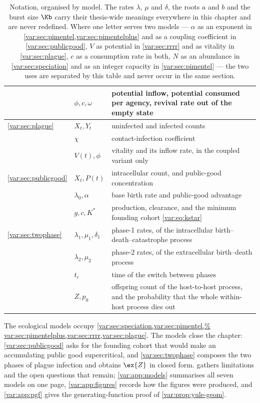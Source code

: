 \begin{table}[H]
\begin{tabular}{@{}ll>{\raggedright\arraybackslash}p{}@{}}
 & $\phi,c,\omega$ & potential inflow, potential consumed per agency, revival rate out of the empty state \\
\midrule
\ref{var:sec:plague}
 & $X_t,Y_t$ & uninfected and infected counts \\
 & $\chi$ & contact-infection coefficient \\
 & $V(t),\phi$ & vitality and its inflow rate, in the coupled variant only \\
\midrule
\ref{var:sec:publicgood}
 & $X_t,P(t)$ & intracellular \yp{} count, and public-good concentration \\
 & $\lambda_0,\alpha$ & base birth rate and public-good advantage \\
 & $g,c,K^\ast$ & production, clearance, and the minimum founding cohort \cref{var:eq:kstar} \\
\midrule
\ref{var:sec:twophase}
 & $\lambda_1,\mu_1,\delta_1$ & phase-1 rates, of the intracellular
   birth--death--catastrophe process \\
 & $\lambda_2,\mu_2$ & phase-2 rates, of the extracellular birth--death
   process \\
 & $t_c$ & time of the switch between phases \\
 & $Z,p_0$ & offspring count of the host-to-host process, and the probability that the whole within-host process dies out \\
\bottomrule
\end{tabular}
\caption{Notation, organised by model. The rates $\lambda$, $\mu$ and
$\delta$, the roots $a$ and $b$ and the burst size $\Kb$ carry their
thesis-wide meanings everywhere in this chapter and are never redefined. Where
one letter serves two models --- $\alpha$ as an exponent in
\cref{var:sec:pimentel,var:sec:pimentelplus} and as a coupling coefficient in
\cref{var:sec:publicgood}, $V$ as potential in \cref{var:sec:rrrr} and as
vitality in \cref{var:sec:plague}, $c$ as a consumption rate in both, $N$ as
an abundance in \cref{var:sec:speciation} and as an integer capacity in
\cref{var:sec:pimentel} --- the two uses are separated by this table and never
occur in the same section.}
\label{var:tab:notation}
\end{table}

The ecological models occupy \cref{var:sec:speciation,var:sec:pimentel,%
var:sec:pimentelplus,var:sec:rrrr,var:sec:plague}. The \yp{} models close the
chapter: \cref{var:sec:publicgood} asks for the founding cohort that would
make an accumulating public good supercritical, and \cref{var:sec:twophase}
composes the two phases of plague infection and obtains $\ex{Z}$ in closed
form.  gathers limitations and the open questions
that remain; \cref{var:app:models} summarises all seven models on one page,
\cref{var:app:figures} records how the figures were produced, and
\cref{var:app:pgf} gives the generating-function proof of
\cref{var:prop:yule-geom}.

\FloatBarrier
